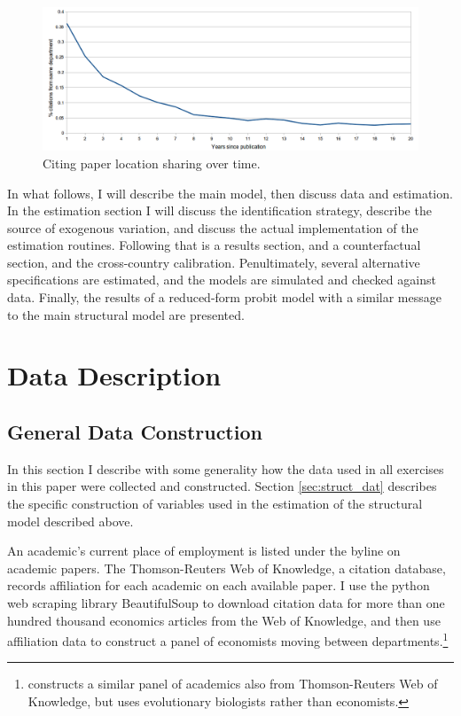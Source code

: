 \documentclass[]{article}
\makeatletter
\def\maxwidth{\ifdim\Gin@nat@width>\linewidth\linewidth
\else\Gin@nat@width\fi}
\let\Oldincludegraphics\includegraphics
\renewcommand{\includegraphics}[1]{\Oldincludegraphics[width=\maxwidth]{#1}}
\makeatother
\begin{document}
\begin{figure}[h!]
    \centering
    \includegraphics{pics/raw_diffusion.png}
    \caption{Citing paper location sharing over time.}
    \label{fig:rawdiffusion}
\end{figure}

In what follows, I will describe the main model, then discuss data and
estimation. In the estimation section I will discuss the identification
strategy, describe the source of exogenous variation, and discuss the
actual implementation of the estimation routines. Following that is a
results section, and a counterfactual section, and the cross-country calibration.
Penultimately, several alternative
specifications are estimated, and the models are simulated and checked
against data.  Finally, the results of a reduced-form probit model with a similar 
message to the main structural model are presented.

\section{Data Description}
\label{sec:dat}

\subsection{General Data Construction}

In this section I describe with some generality how the data used in all
exercises in this paper were collected and constructed.  Section
\ref{sec:struct_dat} describes the specific construction of variables
used in the estimation of the structural model described above.

An academic's current place of employment is listed under the byline on
academic papers. The Thomson-Reuters Web of Knowledge, a citation
database, records affiliation for each academic on each available paper. I use the
python web scraping library BeautifulSoup to download citation data for
more than one hundred thousand economics articles from the Web of
Knowledge, and then use affiliation data to construct a panel of
economists moving between departments.\footnote{\citet{agrawal2013why} constructs a similar panel of academics also from
Thomson-Reuters Web of Knowledge, but uses evolutionary biologists rather than economists.}
\end{document}
